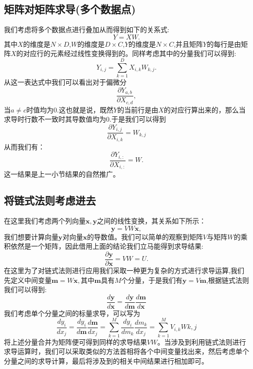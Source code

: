 \documentclass{ctexart}
\begin{document}
\subsection{矩阵对矩阵求导(多个数据点)}
我们考虑将多个数据点进行叠加从而得到如下的关系式:
$$Y=XW.$$
其中$X$的维度是$N×D$,$W$的维度是$D×C$,$Y$的维度是$N×C$,并且矩阵$Y$的每行是由矩阵$X$的对应行的元素经过线性变换得到的。同样考虑其中的分量我们可以得到:
$$Y_{i,j}=\sum_{k=1}^{D}X_{i,k}W_{k,j}.$$
从这一表达式中我们可以看出对于偏微分
$$\frac{\partial Y_{a,b}}{\partial X_{c,d}},$$
当$a\neq c$时值均为0.这也就是说，既然$Y$的当前行是由$X$的对应行算出来的，那么当求导时行数不一致时其导数值均为0.于是我们可以得到
$$\frac{\partial Y_{i,j}}{\partial X_{i,k}} = W_{k,j}$$
从而我们有：
$$\frac{\partial Y_{i,:}}{\partial X_{i,:}} = W.$$这一结果是上一小节结果的自然推广。
\subsection{将链式法则考虑进去}
在这里我们考虑两个列向量$\mathbf{x,y}$之间的线性变换，其关系如下所示：
$$\mathbf{y} = VW\mathbf{x},$$我们想要计算向量$\mathbf{y}$对向量$\mathbf{x}$的导数值。我们可以简单的观察到矩阵$V$与矩阵$W$的乘积依然是一个矩阵，因此借用上面的结论我们立马能得到求导结果:
$$\frac{\partial{\mathbf{y}}}{\partial\mathbf{x}} = VW=U.$$
在这里为了对链式法则进行应用我们采取一种更为复杂的方式进行求导运算,我们先定义中间变量$\mathbf{m} = W\mathbf{x},$其中$\mathbf{m}$具有$M$个分量，于是我们有$\mathbf{y} = V\mathbf{m}$,根据链式法则我们可以得到:
$$\frac{d\mathbf{y}}{d\mathbf{x}}=\frac{d\mathbf{y}}{d\mathbf{m}}\frac{d\mathbf{m}}{d\mathbf{x}}$$
我们考虑单个分量之间的标量求导，可以写为
$$\frac{d{y_i}}{d{x_j}} = \frac{d{y_i}}{d\mathbf{m}}\frac{d\mathbf{m}}{d{x_j}}=\sum_{k=1}^{M}\frac{d{y_i}}{d{m_k}}\frac{d{m_k}}{d{x_j}}=\sum_{k=1}^{M}V_{i,k}W{k,j}$$
将上述分量合并为矩阵便可得到同样的求导结果$VW$。当涉及到利用链式法则进行求导运算时，我们可以采取类似的方法首相将各个中间变量找出来，然后考虑单个分量之间的求导计算，最后将涉及到的相关中间结果进行相加即可。
\end{document}
